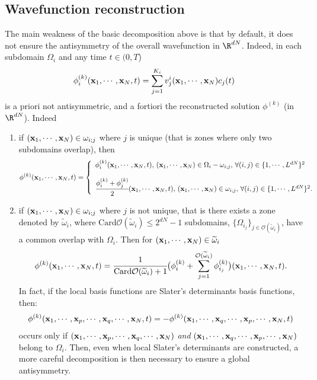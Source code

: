 \subsection{Wavefunction reconstruction}\label{NAWF}
The main weakness of the basic decomposition above is that by default, it does not ensure the antisymmetry of the overall wavefunction in $\R^{dN}$. Indeed, in each subdomain $\Omega_i$ and any time $t\in (0,T$)
\begin{eqnarray*}
\phi_i^{(k)}({\bf x}_1,\cdots,{\bf x}_N,t) = \sum_{j=1}^{K_i}v_j^i({\bf x}_1,\cdots,{\bf x}_N)c_j(t)
\end{eqnarray*} 
is a priori not antisymmetric, and a fortiori the reconstructed solution $\phi^{(k)}$ (in $\R^{dN}$). Indeed
\begin{enumerate} 
\item if $({\bf x}_1,\cdots,{\bf x}_N) \in \omega_{i;j}$ where $j$ is unique (that is zones where only two subdomains overlap), then 
\begin{eqnarray*}
\phi^{(k)}({\bf x}_1,\cdots,{\bf x}_N,t) = 
\left\{
\begin{array}{l}
\phi_i^{(k)}({\bf x}_1,\cdots,{\bf x}_N,t), \, ({\bf x}_1,\cdots,{\bf x}_N) \in \Omega_i-\omega_{i;j}, \, \forall (i,j) \in \{1,\cdots,L^{dN}\}^2\\
\\
\cfrac{\phi_i^{(k)}+\phi_j^{(k)}}{2}({\bf x}_1,\cdots,{\bf x}_N,t), \, ({\bf x}_1,\cdots,{\bf x}_N) \in \omega_{i;j}, \, \forall (i,j) \in \{1,\cdots,L^{dN}\}^2.
\end{array}
\right.
\end{eqnarray*}
\item if $({\bf x}_1,\cdots,{\bf x}_N) \in \omega_{i;j}$ where $j$ is not unique, that is there exists a zone denoted by $\widetilde{\omega}_i$, where $\textrm{Card}\mathcal{O}(\widetilde{\omega}_i) \leq 2^{dN}-1$ subdomains, $\{\Omega_{i_j}\}_{j \in\mathcal{O}(\widetilde{\omega}_i)}$, have a common overlap with $\Omega_i$. Then for $({\bf x}_1,\cdots,{\bf x}_N) \in \widetilde{\omega}_{i}$
\begin{eqnarray*}
\phi^{(k)}({\bf x}_1,\cdots,{\bf x}_N,t) = \cfrac{1}{\textrm{Card}\mathcal{O}(\widetilde{\omega}_i)+1}\big(\phi_i^{(k)}+\sum_{j=1}^{\mathcal{O}(\widetilde{\omega}_i)}\phi_{i_j}^{(k)}\big)({\bf x}_1,\cdots,{\bf x}_N,t).
\end{eqnarray*}
In fact, if the local basis functions are Slater's determinants basis functions, then:
\begin{eqnarray*}
\phi^{(k)}({\bf x}_1,\cdots,{\bf x}_p,\cdots,{\bf x}_q,\cdots,{\bf x}_N,t) = -\phi^{(k)}({\bf x}_1,\cdots,{\bf x}_q,\cdots,{\bf x}_p,\cdots,{\bf x}_N,t)
\end{eqnarray*}
occurs only if $({\bf x}_1,\cdots,{\bf x}_p,\cdots,{\bf x}_q,\cdots,{\bf x}_N)$ {\it and} $({\bf x}_1,\cdots,{\bf x}_q,\cdots,{\bf x}_p,\cdots,{\bf x}_N)$ belong to $\Omega_i$. Then, even when local Slater's determinants are constructed, a more careful decomposition is then necessary to ensure a global antisymmetry.
\end{enumerate}
